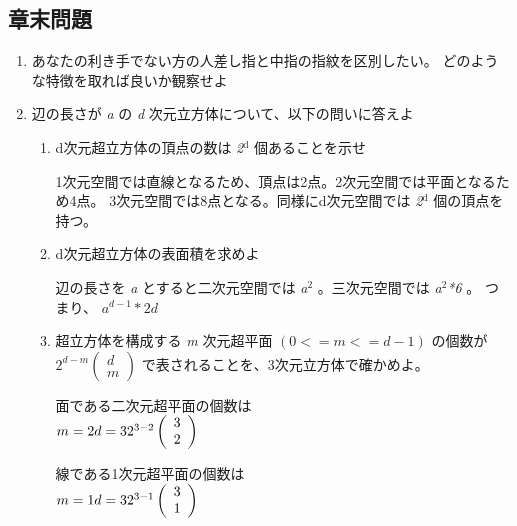 \documentclass[11pt]{article}
\begin{document}
\subsection{章末問題}
\label{sec:orgheadline15}
\begin{enumerate}
\item あなたの利き手でない方の人差し指と中指の指紋を区別したい。
\label{sec:orgheadline8}
どのような特徴を取れば良いか観察せよ
\item 辺の長さが \emph{a} の \emph{d} 次元立方体について、以下の問いに答えよ
\label{sec:orgheadline14}
\begin{enumerate}
\item d次元超立方体の頂点の数は \emph{2\(^{\text{d}}\)} 個あることを示せ
\label{sec:orgheadline9}

1次元空間では直線となるため、頂点は2点。2次元空間では平面となるため4点。
3次元空間では8点となる。同様にd次元空間では \emph{2\(^{\text{d}}\)} 個の頂点を持つ。

\item d次元超立方体の表面積を求めよ
\label{sec:orgheadline10}

辺の長さを \emph{a} とすると二次元空間では \emph{a\(^{\text{2}}\)} 。三次元空間では \emph{a\(^{\text{2}}\)*6} 。
つまり、 \(a^{d-1}*2d\)

\item 超立方体を構成する \emph{m} 次元超平面 \((0<=m<=d-1)\) の個数が
\label{sec:orgheadline11}
\(2^{d-m}\left ( \begin{array}{c} d \\ m \end{array} \right )\)
で表されることを、3次元立方体で確かめよ。

面である二次元超平面の個数は\\
\(m = 2 \\ d = 3 \\ 2^{3-2}\left ( \begin{array}{c} 3 \\ 2 \\ \end{array} \right )\)

線である1次元超平面の個数は\\
\(m = 1 \\ d = 3 \\ 2^{3-1}\left ( \begin{array}{c} 3 \\ 1 \\ \end{array} \right )\)


\end{enumerate}
\end{enumerate}
\end{document}
